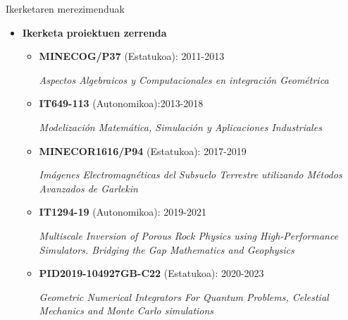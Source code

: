 \documentclass[
 10pt,%
 compress,%
 t,       %
 xcolor=svgnames
]{beamer}
\theoremstyle{definition} \newtheorem{definicion}{Definicion}[section]
\theoremstyle{propiedades} \newtheorem{propiedades}{Propiedades}[section]
\begin{document}

\begin{frame}{Ikerketaren merezimenduak} 					  

\medskip

\begin{itemize}

\item \textbf{Ikerketa proiektuen zerrenda}

\medskip
\small
\begin{itemize}
\item \textbf{MINECOG/P37} (Estatukoa): 2011-2013

\textit{Aspectos Algebraicos y Computacionales en integración Geométrica}

\medskip
\item \textbf{IT649-113} (Autonomikoa):2013-2018

\textit{Modelización Matemática, Simulación y Aplicaciones Industriales}

\medskip
\item \textbf{MINECOR1616/P94} (Estatukoa): 2017-2019

\textit{Imágenes Electromagnéticas del Subsuelo Terrestre utilizando Métodos Avanzados de Garlekin}

\medskip
\item \textbf{IT1294-19} (Autonomikoa): 2019-2021  

\textit{Multiscale Inversion of Porous Rock Physics using High-Performance Simulators. Bridging the Gap Mathematics and Geophysics}

\medskip
\item \textbf{PID2019-104927GB-C22} (Estatukoa): 2020-2023

\textit{Geometric Numerical Integrators For Quantum Problems, Celestial Mechanics and Monte Carlo simulations} 

\end{itemize}

\end{itemize}




\end{frame}
\end{document}
